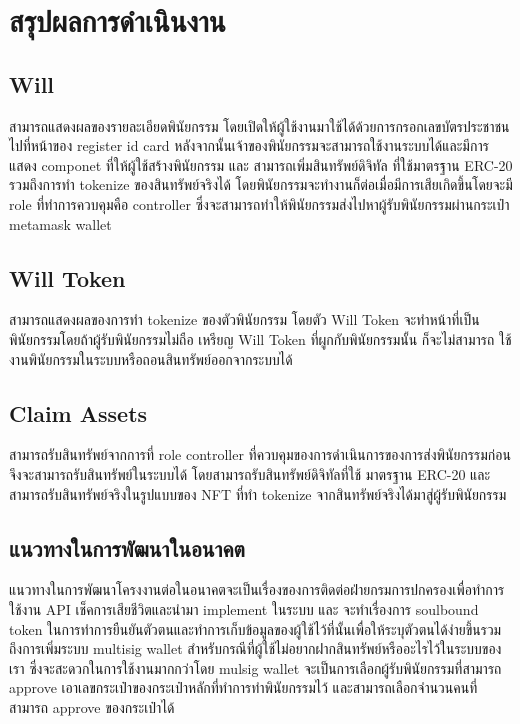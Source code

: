 \documentclass[12pt,oneside,openright,a4paper]{cpe-thai-project}
\begin{document}
\section{สรุปผลการดำเนินงาน}
\subsection{Will}
\tab สามารถแสดงผลของรายละเอียดพินัยกรรม โดยเปิดให้ผู้ใช้งานมาใช้ได้ด้วยการกรอกเลขบัตรประชาชนไปที่หน้าของ register id card หลังจากนั้นเจ้าของพินัยกรรมจะสามารถใช้งานระบบได้และมีการแสดง componet ที่ให้ผู้ใช้สร้างพินัยกรรม และ สามารถเพิ่มสินทรัพย์ดิจิทัล ที่ใช้มาตรฐาน ERC-20 รวมถึงการทำ tokenize ของสินทรัพย์จริงได้ โดยพินัยกรรมจะทำงานก็ต่อเมื่อมีการเสียเกิดขึ้นโดยจะมี role ที่ทำการควบคุมคือ controller ซึ่งจะสามารถทำให้พินัยกรรมส่งไปหาผู้รับพินัยกรรมผ่านกระเป๋า metamask wallet\\
\subsection{Will Token}
\tab สามารถแสดงผลของการทำ tokenize ของตัวพินัยกรรม โดยตัว Will Token จะทำหน้าที่เป็นพินัยกรรมโดยถ้าผู้รับพินัยกรรมไม่ถือ เหรียญ Will Token ที่ผูกกับพินัยกรรมนั้น ก็จะไม่สามารถ ใช้งานพินัยกรรมในระบบหรือถอนสินทรัพย์ออกจากระบบได้\\
\subsection{Claim Assets}
\tab สามารถรับสินทรัพย์จากการที่ role controller ที่ควบคุมของการดำเนินการของการส่งพินัยกรรมก่อนจึงจะสามารถรับสินทรัพย์ในระบบได้ โดยสามารถรับสินทรัพย์ดิจิทัลที่ใช้ มาตรฐาน ERC-20 และ สามารถรับสินทรัพย์จริงในรูปแบบของ NFT ที่ทำ tokenize จากสินทรัพย์จริงได้มาสู่ผู้รับพินัยกรรม\\

\subsection{แนวทางในการพัฒนาในอนาคต}
\tab แนวทางในการพัฒนาโครงงานต่อในอนาคตจะเป็นเรื่องของการติดต่อฝ่ายกรมการปกครองเพื่อทำการใช้งาน API เช็คการเสียชีวิตและนำมา implement ในระบบ และ จะทำเรื่องการ soulbound token ในการทำการยืนยันตัวตนและทำการเก็บข้อมูลของผู้ใช้ไว้ที่นั้นเพื่อให้ระบุตัวตนได้ง่ายขึ้นรวมถึงการเพิ่มระบบ multisig wallet สำหรับกรณีที่ผู้ใช้ไม่อยากฝากสินทรัพย์หรืออะไรไว้ในระบบของเรา ซึ่งจะสะดวกในการใช้งานมากกว่าโดย mulsig wallet จะเป็นการเลือกผู้รับพินัยกรรมที่สามารถ approve เอาเลขกระเป๋าของกระเป๋าหลักที่ทำการทำพินัยกรรมไว้ และสามารถเลือกจำนวนคนที่สามารถ approve ของกระเป๋าได้\\
\end{document}
